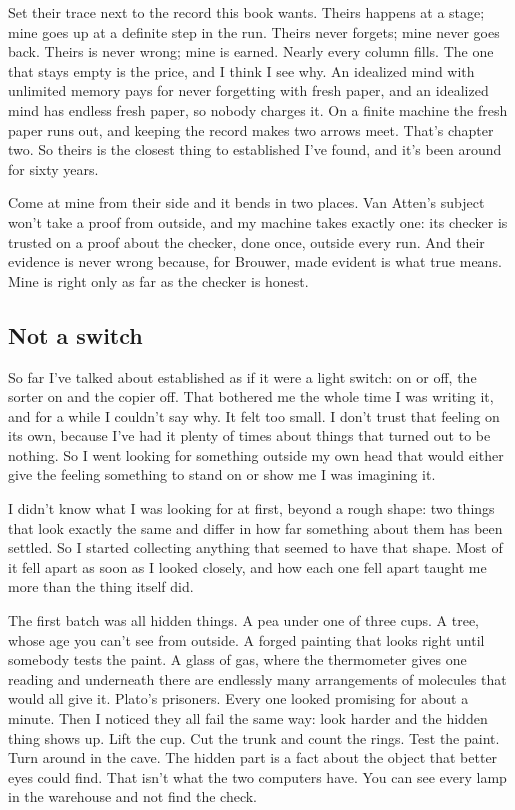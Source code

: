 \documentclass[11pt,twoside]{article}
\theoremstyle{thielethm}
\theoremstyle{thieledef}
\theoremstyle{thieledef}
\theoremstyle{thieledef}
\theoremstyle{thielethm}
\theoremstyle{thieleobs}
\theoremstyle{thielethm}
\begin{document}
Set their trace next to the record this book wants. Theirs happens at a stage; mine goes up at a definite step in the run. Theirs never forgets; mine never goes back. Theirs is never wrong; mine is earned. Nearly every column fills. The one that stays empty is the price, and I think I see why. An idealized mind with unlimited memory pays for never forgetting with fresh paper, and an idealized mind has endless fresh paper, so nobody charges it. On a finite machine the fresh paper runs out, and keeping the record makes two arrows meet. That's chapter two. So theirs is the closest thing to established I've found, and it's been around for sixty years.

Come at mine from their side and it bends in two places. Van Atten's subject won't take a proof from outside, and my machine takes exactly one: its checker is trusted on a proof about the checker, done once, outside every run. And their evidence is never wrong because, for Brouwer, made evident is what true means. Mine is right only as far as the checker is honest.

\subsection{Not a switch}

So far I've talked about established as if it were a light switch: on or off, the sorter on and the copier off. That bothered me the whole time I was writing it, and for a while I couldn't say why. It felt too small. I don't trust that feeling on its own, because I've had it plenty of times about things that turned out to be nothing. So I went looking for something outside my own head that would either give the feeling something to stand on or show me I was imagining it.

I didn't know what I was looking for at first, beyond a rough shape: two things that look exactly the same and differ in how far something about them has been settled. So I started collecting anything that seemed to have that shape. Most of it fell apart as soon as I looked closely, and how each one fell apart taught me more than the thing itself did.

The first batch was all hidden things. A pea under one of three cups. A tree, whose age you can't see from outside. A forged painting that looks right until somebody tests the paint. A glass of gas, where the thermometer gives one reading and underneath there are endlessly many arrangements of molecules that would all give it. Plato's prisoners. Every one looked promising for about a minute. Then I noticed they all fail the same way: look harder and the hidden thing shows up. Lift the cup. Cut the trunk and count the rings. Test the paint. Turn around in the cave. The hidden part is a fact about the object that better eyes could find. That isn't what the two computers have. You can see every lamp in the warehouse and not find the check.
\end{document}
